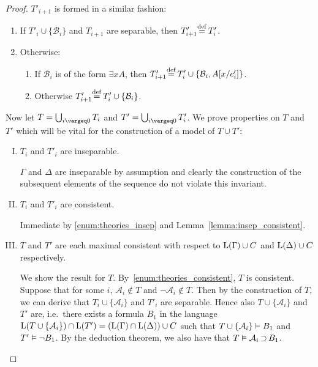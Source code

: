 \begin{proof}
	\noindent
	$T'_{i+1}$ is formed in a similar fashion:
	\begin{enumerate}[~~(1$'$)]
		\item
			If $T'_{i} \cup \{\mathcal{B}_i\}$ and $T_{i+1}$ are separable, then $T'_{i+1} \defeq{}\, T'_i$.
		\item
			\begin{samepage}
				Otherwise: 
			\begin{enumerate}[~(2$'$a)]
				\item If $\mathcal{B}_i$ is of the form $\exists x A$, then $T'_{i+1} \defeq{}\, T'_i \cup \{ \mathcal{B}_i, A\subst{x/c'_i} \}$.
				\item Otherwise $T'_{i+1} \defeq{}\, T'_i \cup \{ \mathcal{B}_i \}$.
			\end{enumerate}
			\end{samepage}
	\end{enumerate}

	Now let
	$T = \bigcup_{i\vargeq 0} T_i$
	and
	$T' = \bigcup_{i\vargeq 0} T'_i$.
	We prove properties on $T$ and $T'$ which will be vital for the construction of a model of $T\cup T'$:

	\begin{enumerate}[I.]
		\item
			\label{enum:theories_insep}
			$T_i$ and $T'_i$ are inseparable.

			$\Gamma$ and $\Delta$ are inseparable by assumption and clearly the construction of the subsequent elements of the sequence do not violate this invariant.

			\item 
			\label{enum:theories_consistent}
			$T_i$ and $T'_i$ are consistent.

			Immediate by \ref{enum:theories_insep} and Lemma~\ref{lemma:insep_consistent}.

		\item
			\label{enum:each_max_consistent}
			$T$ and $T'$ are each maximal consistent with respect to $\operatorname{L}(\Gamma) \cup C$ and $\operatorname{L}(\Delta) \cup C$ respectively.

			We show the result for $T$.
			By~\ref{enum:theories_consistent}, $T$ is consistent.
			Suppose that for some $i$, $\mathcal{A}_i \not\in T$ and $\lnot\mathcal{A}_i \not\in T$.
			Then by the construction of $T$, we can derive that
			$T_i \cup \{\mathcal{A}_i\}$ and $T'_i$ are separable.
			Hence also
			$T \cup \{\mathcal{A}_i\}$ and $T'$ are, i.e.\ there exists a formula $B_1$ in the language $\operatorname{L}(T\cup\{\mathcal{A}_i\}) \cap \operatorname{L}(T') = (\operatorname{L}(\Gamma) \cap \operatorname{L}(\Delta)) \cup C$ such that
			$T \cup \{\mathcal{A}_i\} \vDash B_1$ and $T' \vDash \lnot B_1$.
			By the deduction theorem, we also have that \markA{} $T \vDash \mathcal{A}_i \operatorname{\supset} B_1$.


\end{enumerate}
\end{proof}
